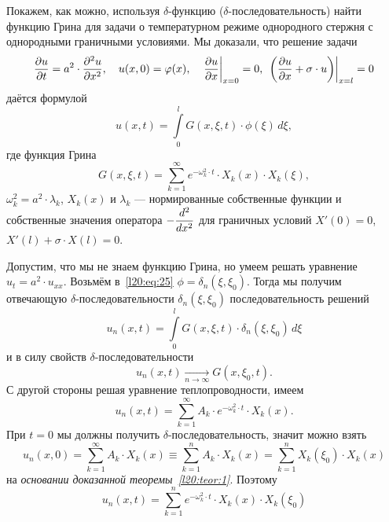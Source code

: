 Покажем, как можно, используя $\delta$-функцию ($\delta$-последовательность) найти функцию Грина для задачи о температурном режиме однородного стержня с однородными граничными условиями. Мы доказали, что решение задачи 
\begin{equation*}
	\pder{u}{t}=a^2\cdot\pdder{u}{x},\quad u(x,0)=\phi(x),\quad\left.\pder{u}{x}\right|_{x=0}=0,\ \left.\left(\pder{u}{x}+\sigma\cdot u\right)\right|_{x=l}=0
\end{equation*}
даётся формулой
\begin{equation}\label{l20:eq:25}
	u(x,t)=\int\limits_0^l G(x,\xi,t)\cdot\phi(\xi)\,d\xi,
\end{equation}
где функция Грина 
\begin{equation*}
	G(x,\xi,t)=\sum\limits_{k=1}^{\infty}e^{-\omega_k^2\cdot t}\cdot X_k(x)\cdot X_k(\xi),
\end{equation*}
$\omega_k^2=a^2\cdot\lambda_k$, $X_k(x)$ и $\lambda_k$ --- нормированные собственные функции и собственные значения оператора $\displaystyle-\frac{d^2}{dx^2}$ для граничных условий $X'(0)=0$, $X'(l)+\sigma\cdot X(l)=0$.

Допустим, что мы не знаем функцию Грина, но умеем решать уравнение $u_t=a^2\cdot u_{xx}$. Возьмём в~\eqref{l20:eq:25} $\phi=\delta_n(\xi,\xi_0)$. Тогда мы получим отвечающую $\delta$-последовательности $\delta_n(\xi,\xi_0)$ последовательность решений 
\begin{equation*}
	u_n(x,t)=\int\limits_0^l G(x,\xi,t)\cdot\delta_n(\xi,\xi_0)\,d\xi
\end{equation*} 
и в силу свойств $\delta$-последовательности
\begin{equation*}
	u_n(x,t)\mathop{\longrightarrow}\limits_{n\to\infty}G(x,\xi_0,t).
\end{equation*}
С другой стороны решая уравнение теплопроводности, имеем
\begin{equation*}
	u_n(x,t)=\sum\limits_{k=1}^{\infty}A_k\cdot e^{-\omega_k^2\cdot t}\cdot X_k(x).
\end{equation*}
При $t=0$ мы должны получить $\delta$-последовательность, значит можно взять
\begin{equation*}
	u_n(x,0)=\sum\limits_{k=1}^{\infty}A_k\cdot X_k(x)\equiv\sum\limits_{k=1}^{n}A_k\cdot X_k(x)=\sum\limits_{k=1}^{n}X_k(\xi_0)\cdot X_k(x)
\end{equation*}
на \emph{основании доказанной теоремы~\ref{l20:teor:1}}. Поэтому 
\begin{equation*}
	u_n(x,t)=\sum\limits_{k=1}^{n}e^{-\omega_k^2\cdot t}\cdot X_k(x)\cdot X_k(\xi_0)
\end{equation*} 


